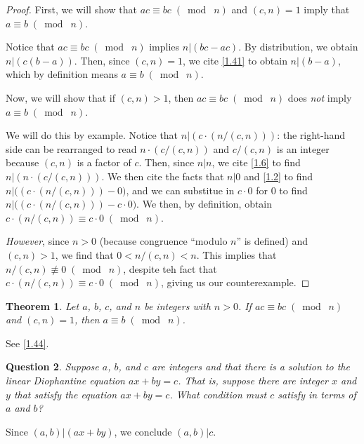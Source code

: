 \documentclass{article}
\newtheorem{thm}{Theorem}[section]
\newtheorem{ques}[thm]{Question}
\numberwithin{equation}{thm}
\providecommand{\gmod}[1]{\; (\bmod \; #1)}
\begin{document}
\begin{proof}
  First, we will show that $ac \equiv bc \gmod n$ and $(c, n) = 1$ imply that $a \equiv b \gmod n$.

  Notice that $ac \equiv bc \gmod n$ implies $n | (bc - ac)$. By distribution, we obtain $n | \left( c (b - a) \right)$. Then, since $(c, n) = 1$, we cite \ref{1.41} to obtain $n | (b - a)$, which by definition means $a \equiv b \gmod n$.

  Now, we will show that if $(c, n) > 1$, then $ac \equiv bc \gmod n$ does \emph{not} imply $a \equiv b \gmod n$.

  We will do this by example. Notice that $n | \left( c \cdot (n / (c, n)) \right)$: the right-hand side can be rearranged to read $n \cdot (c / (c, n))$ and $c / (c, n)$ is an integer because $(c, n)$ is a factor of $c$. Then, since $n|n$, we cite \ref{1.6} to find $n | \left( n \cdot (c / (c, n)) \right)$.
  We then cite the facts that $n | 0$ and \ref{1.2} to find $n | \big( (c \cdot (n / (c, n))) - 0 \big)$, and we can substitue in $c \cdot 0$ for $0$ to find $n | \big( (c \cdot (n / (c, n))) - c \cdot 0 \big)$. We then, by definition, obtain $c \cdot (n / (c, n)) \equiv c \cdot 0 \gmod n$.

  \emph{However}, since $n > 0$ (because congruence ``modulo $n$'' is defined) and $(c, n) > 1$, we find that $0 < n / (c, n) < n$. This implies that $n / (c, n) \not\equiv 0 \gmod n$, despite teh fact that $c \cdot (n / (c, n)) \equiv c \cdot 0 \gmod n$, giving us our counterexample.
\end{proof}



\begin{thm} \label{1.45}
  Let $a$, $b$, $c$, and $n$ be integers with $n > 0$. If $ac \equiv bc \gmod n$ and $(c, n) = 1$, then $a \equiv b \gmod n$.
\end{thm}

See \ref{1.44}.



\begin{ques} \label{1.46}
  Suppose $a$, $b$, and $c$ are integers and that there is a solution to the linear Diophantine equation $ax + by = c$. That is, suppose there are integer $x$ and $y$ that satisfy the equation $ax + by = c$. What condition must $c$ satisfy in terms of $a$ and $b$?
\end{ques}

Since $(a, b) | (ax + by)$, we conclude $(a, b) | c$.
\end{document}
